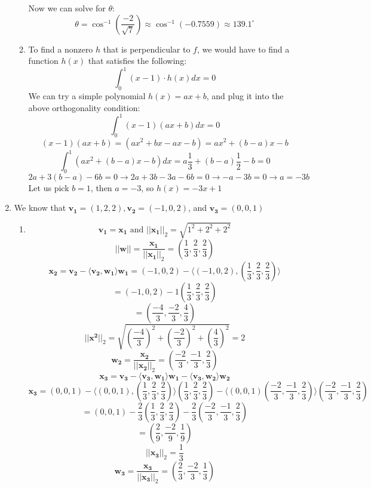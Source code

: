 \documentclass[12pt]{article}
\begin{document}
\begin{enumerate}[leftmargin=0em]
\begin{enumerate}[leftmargin=!]
    Now we can solve for $\theta$:
    \[\theta = \cos^{-1}(\frac{-2}{\sqrt{7}}) \approx \cos^{-1}(-0.7559) \approx 139.1^{\circ}\]
    \item
    To find a nonzero $h$ that is perpendicular to $f$, we would have to find a function $h(x)$ that satisfies the following:
    \[ \int_{0}^{1}(x-1) \cdot h(x) dx = 0\]
    We can try a simple polynomial $h(x) = ax + b$, and plug it into the above orthogonality condition:
    \[\int_{0}^{1}(x-1)(ax+b)dx = 0\]
    \[(x-1)(ax+b) = (ax^2+bx -ax - b) = ax^2 + (b-a)x - b\]
    \[\int_{0}^{1}(ax^2+(b-a)x-b)dx = a\frac{1}{3}+(b-a)\frac{1}{2}-b = 0\]
    \[2a+3(b-a) - 6b = 0 \rightarrow 2a+3b-3a-6b = 0 \rightarrow -a -3b = 0 \rightarrow a = -3b\]
    Let us pick $b=1$, then $a = -3$, so $h(x) = -3x+1$
  \end{enumerate}

  \item
  We know that $\mathbf{v_1} = (1, 2, 2), \mathbf{v_2} = (-1, 0, 2)$, and $\mathbf{v_3} = (0,0,1)$

  \begin{enumerate}[leftmargin=!]
    \item
    \[ \mathbf{v_1} = \mathbf{x_1} \text{ and } ||\mathbf{x_1}||_{2} = \sqrt{1^2+2^2+2^2}\]
    \[ ||\mathbf{w}|| = \frac{\mathbf{x_1}}{||\mathbf{x_1}||_2} = (\frac{1}{3}, \frac{2}{3}, \frac{2}{3}) \]
    \[ \mathbf{x_2} = \mathbf{v_2} - \langle \mathbf{v_2}, \mathbf{w_1} \rangle \mathbf{w_1} = (-1, 0, 2) - \langle (-1, 0, 2) , (\frac{1}{3}, \frac{2}{3}, \frac{2}{3}) \rangle\]
    \[ = (-1, 0, 2) - 1(\frac{1}{3}, \frac{2}{3}, \frac{2}{3})\]
    \[ = (\frac{-4}{3}, \frac{-2}{3}, \frac{4}{3})\]   
    \[||\mathbf{x^2}||_2 = \sqrt{(\frac{-4}{3})^{2} + (\frac{-2}{3})^{2} + (\frac{4}{3})^{2}} = 2\] 
    \[ \mathbf{w_2} = \frac{\mathbf{x_2}}{||\mathbf{x_2}||_2} = (\frac{-2}{3}, \frac{-1}{3}, \frac{2}{3})\]
    \[ \mathbf{x_3} = \mathbf{v_3} - \langle \mathbf{v_3}, \mathbf{w_1} \rangle \mathbf{w_1} - \langle \mathbf{v_3}, \mathbf{w_2} \rangle \mathbf{w_2}\]
    \[ \mathbf{x_3} = (0, 0, 1) - \langle (0, 0, 1), (\frac{1}{3}, \frac{2}{3}, \frac{2}{3})\rangle (\frac{1}{3}, \frac{2}{3}, \frac{2}{3}) - \langle (0,0,1) (\frac{-2}{3}, \frac{-1}{3}, \frac{2}{3}) \rangle (\frac{-2}{3}, \frac{-1}{3}, \frac{2}{3})\]
    \[ = (0,0,1) - \frac{2}{3}(\frac{1}{3}, \frac{2}{3}, \frac{2}{3}) - \frac{2}{3}(\frac{-2}{3}, \frac{-1}{3}, \frac{2}{3})\]
    \[ = (\frac{2}{9}, \frac{-2}{9}, \frac{1}{9})\]
    \[ || \mathbf{x_3} ||_2 = \frac{1}{3} \]
    \[ \mathbf{w_3} = \frac{\mathbf{x_3}}{||\mathbf{x_3}||_2} = (\frac{2}{3}, \frac{-2}{3}, \frac{1}{3})\]


\end{enumerate}
\end{enumerate}
\end{document}
